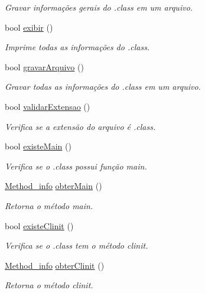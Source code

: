 \begin{DoxyCompactItemize}
\begin{DoxyCompactList}\small\item\em Gravar informações gerais do .class em um arquivo. \end{DoxyCompactList}\item 
bool \hyperlink{classClassFile_a7da7cc6de8de3fc6f27faf3b76f4883a}{exibir} ()
\begin{DoxyCompactList}\small\item\em Imprime todas as informações do .class. \end{DoxyCompactList}\item 
bool \hyperlink{classClassFile_a452169cb59d63012f98a34a3fff2c2f7}{gravar\+Arquivo} ()
\begin{DoxyCompactList}\small\item\em Gravar todas as informações do .class em um arquivo. \end{DoxyCompactList}\item 
bool \hyperlink{classClassFile_a8dd042ff6873b9f0d16f8ee3812261e1}{validar\+Extensao} ()
\begin{DoxyCompactList}\small\item\em Verifica se a extensão do arquivo é .class. \end{DoxyCompactList}\item 
bool \hyperlink{classClassFile_a10bfe22492b473fb0197e55f451978e5}{existe\+Main} ()
\begin{DoxyCompactList}\small\item\em Verifica se o .class possui função main. \end{DoxyCompactList}\item 
\hyperlink{structMethod__info}{Method\+\_\+info} \hyperlink{classClassFile_afdbe9cc2f360e04273470202c4f247dc}{obter\+Main} ()
\begin{DoxyCompactList}\small\item\em Retorna o método main. \end{DoxyCompactList}\item 
bool \hyperlink{classClassFile_a2a886bdb4c42bfaaf5ea8ff1b2c41209}{existe\+Clinit} ()
\begin{DoxyCompactList}\small\item\em Verifica se o .class tem o método clinit. \end{DoxyCompactList}\item 
\hyperlink{structMethod__info}{Method\+\_\+info} \hyperlink{classClassFile_a1141f5a8c856d5f3931f0b518e219f79}{obter\+Clinit} ()
\begin{DoxyCompactList}\small\item\em Retorna o método clinit. \end{DoxyCompactList}\item 

\end{DoxyCompactItemize}
